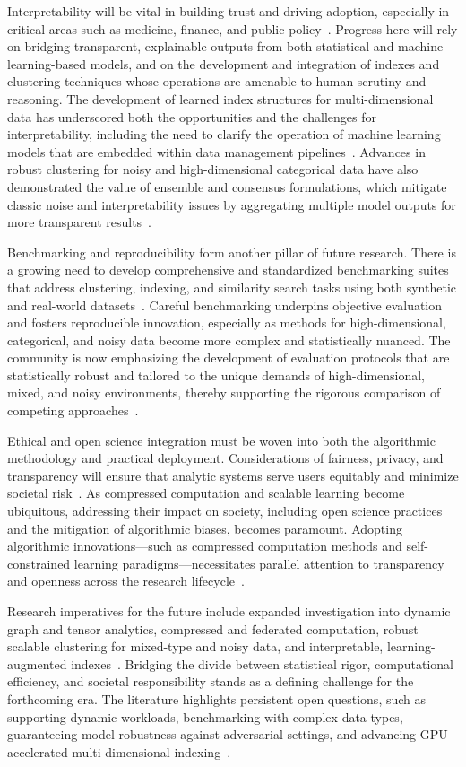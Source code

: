 \documentclass[sigconf]{acmart}
\begin{document}
Interpretability will be vital in building trust and driving adoption, especially in critical areas such as medicine, finance, and public policy~\cite{ref110,ref116}. Progress here will rely on bridging transparent, explainable outputs from both statistical and machine learning-based models, and on the development and integration of indexes and clustering techniques whose operations are amenable to human scrutiny and reasoning. The development of learned index structures for multi-dimensional data has underscored both the opportunities and the challenges for interpretability, including the need to clarify the operation of machine learning models that are embedded within data management pipelines~\cite{ref110}. Advances in robust clustering for noisy and high-dimensional categorical data have also demonstrated the value of ensemble and consensus formulations, which mitigate classic noise and interpretability issues by aggregating multiple model outputs for more transparent results~\cite{ref116}.

Benchmarking and reproducibility form another pillar of future research. There is a growing need to develop comprehensive and standardized benchmarking suites that address clustering, indexing, and similarity search tasks using both synthetic and real-world datasets~\cite{ref116}. Careful benchmarking underpins objective evaluation and fosters reproducible innovation, especially as methods for high-dimensional, categorical, and noisy data become more complex and statistically nuanced. The community is now emphasizing the development of evaluation protocols that are statistically robust and tailored to the unique demands of high-dimensional, mixed, and noisy environments, thereby supporting the rigorous comparison of competing approaches~\cite{ref110,ref116}.

Ethical and open science integration must be woven into both the algorithmic methodology and practical deployment. Considerations of fairness, privacy, and transparency will ensure that analytic systems serve users equitably and minimize societal risk~\cite{ref117,ref118}. As compressed computation and scalable learning become ubiquitous, addressing their impact on society, including open science practices and the mitigation of algorithmic biases, becomes paramount. Adopting algorithmic innovations—such as compressed computation methods and self-constrained learning paradigms—necessitates parallel attention to transparency and openness across the research lifecycle~\cite{ref117,ref118}.

Research imperatives for the future include expanded investigation into dynamic graph and tensor analytics, compressed and federated computation, robust scalable clustering for mixed-type and noisy data, and interpretable, learning-augmented indexes~\cite{ref110,ref116,ref118}. Bridging the divide between statistical rigor, computational efficiency, and societal responsibility stands as a defining challenge for the forthcoming era. The literature highlights persistent open questions, such as supporting dynamic workloads, benchmarking with complex data types, guaranteeing model robustness against adversarial settings, and advancing GPU-accelerated multi-dimensional indexing~\cite{ref110,ref116}.
\end{document}
